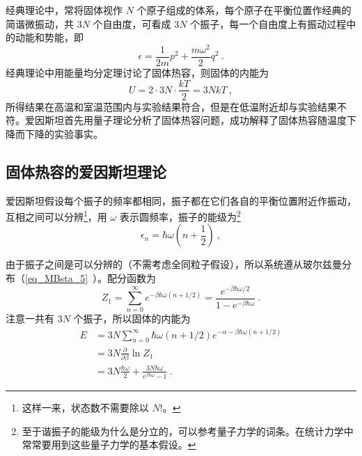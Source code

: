 

经典理论中，常将固体视作 $N$ 个原子组成的体系，每个原子在平衡位置作经典的简谐微振动，共 $3N$ 个自由度，可看成 $3N$ 个振子，每一个自由度上有振动过程中的动能和势能，即
\begin{equation}
\epsilon=\frac{1}{2m}p^2+\frac{m\omega^2}{2}q^2~.
\end{equation}
经典理论中用能量均分定理讨论了固体热容，则固体的内能为
\begin{equation}
U=2\cdot 3N\cdot \frac{kT}{2}=3NkT~,
\end{equation}
所得结果在高温和室温范围内与实验结果符合，但是在低温附近却与实验结果不符。爱因斯坦首先用量子理论分析了固体热容问题，成功解释了固体热容随温度下降而下降的实验事实。

\subsection{固体热容的爱因斯坦理论}
爱因斯坦假设每个振子的频率都相同，振子都在它们各自的平衡位置附近作振动，互相之间可以分辨\footnote{这样一来，状态数不需要除以 $N!$。}，用 $\omega$ 表示圆频率，振子的能级为\footnote{至于谐振子的能级为什么是分立的，可以参考量子力学的词条。在统计力学中常常要用到这些量子力学的基本假设。}
\begin{equation}
\epsilon_n=\hbar \omega\left(n+\frac{1}{2}\right)~,
\end{equation}

由于振子之间是可以分辨的（不需考虑全同粒子假设），所以系统遵从玻尔兹曼分布（\autoref{eq_MBsta_5}~）。配分函数为
\begin{equation}
Z_1=\sum_{n=0}^\infty e^{-\beta \hbar \omega(n+1/2)}=\frac{e^{-\beta\hbar \omega/2}}{1-e^{-\beta\hbar\omega}}~.
\end{equation}
注意一共有 $3N$ 个振子，所以固体的内能为
\begin{equation}\label{eq_EScap_1}
\begin{aligned}
E&=3N\sum_{n=0}^\infty \hbar\omega(n+1/2)e^{-\alpha-\beta\hbar\omega(n+1/2)}\\
&=3N\frac{\partial }{\partial \beta}\ln Z_1\\
&=3N\frac{\hbar \omega}{2}+\frac{3N\hbar \omega}{e^{\beta\hbar\omega}-1}~.
\end{aligned}
\end{equation}

